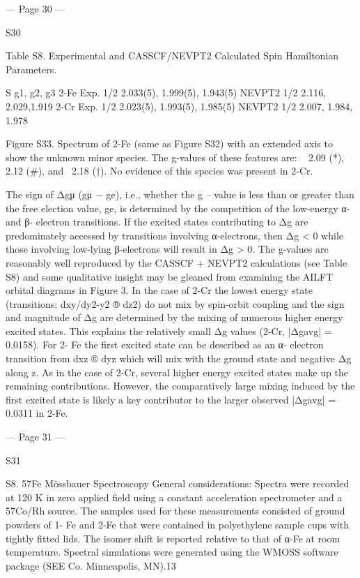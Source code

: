  


--- Page 30 ---
 
 
S30 
 
 
Table S8. Experimental and CASSCF/NEVPT2 Calculated Spin Hamiltonian Parameters. 
 
 
S 
g1, g2, g3 
2-Fe 
Exp. 
1/2 
2.033(5), 1.999(5), 1.943(5) 
NEVPT2 
1/2 
2.116, 2.029,1.919  
2-Cr 
Exp. 
1/2 
2.023(5), 1.993(5), 1.985(5) 
NEVPT2 
1/2 
2.007, 1.984, 1.978 
 
 
Figure S33. Spectrum of 2-Fe (same as Figure S32) with an extended axis to show the unknown minor species. The g-values 
of these features are: ~ 2.09 (*), 2.12 (#), and ~2.18 (†). No evidence of this species was present in 2-Cr. 
 
The sign of Δgμ (gμ − ge), i.e., whether the g – value is less than or greater than the free election value, ge, is determined 
by the competition of the low-energy α- and β- electron transitions. If the excited states contributing to Δg are predominately 
accessed by transitions involving α-electrons, then Δg < 0 while those involving low-lying β-electrons will result in Δg > 0. 
The g-values are reasonably well reproduced by the CASSCF + NEVPT2 calculations (see Table S8) and some qualitative 
insight may be gleaned from examining the AILFT orbital diagrams in Figure 3. In the case of 2-Cr the lowest energy state 
(transitions: {dxy/dy2-y2} ® {dz2}) do not mix by spin-orbit coupling and the sign and magnitude of Δg are determined by the 
mixing of numerous higher energy excited states. This explains the relatively small Δg values (2-Cr, |Δgavg| = 0.0158). For 2-
Fe the first excited state can be described as an α- electron transition from {dxz} ® {dyz} which will mix with the ground state 
and negative Δg along z. As in the case of 2-Cr, several higher energy excited states make up the remaining contributions. 
However, the comparatively large mixing induced by the first excited state is likely a key contributor to the larger observed 
|Δgavg| = 0.0311 in 2-Fe. 
 


--- Page 31 ---
 
 
S31 
 
 
S8. 57Fe Mössbauer Spectroscopy 
General considerations: Spectra were recorded at 120 K in zero applied field using a constant acceleration 
spectrometer and a 57Co/Rh source. The samples used for these measurements consisted of ground powders of 1-
Fe and 2-Fe that were contained in polyethylene sample cups with tightly fitted lids. The isomer shift is reported 
relative to that of α-Fe at room temperature. Spectral simulations were generated using the WMOSS software 
package (SEE Co. Minneapolis, MN).13 
 
